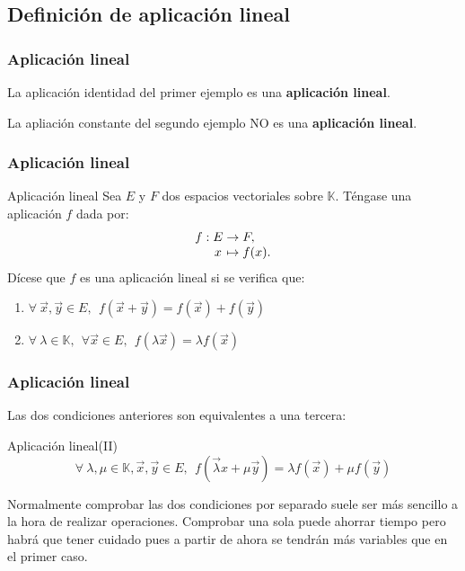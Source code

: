 \documentclass{beamer}
\begin{document}
\subsection{Definici\'on de aplicaci\'on lineal}


\begin{frame}
  \frametitle{Aplicaci\'on lineal}
La aplicaci\'on identidad del primer ejemplo es una \textbf{aplicaci\'on lineal}.

La apliaci\'on constante del segundo ejemplo NO es una \textbf{aplicaci\'on lineal}.
\end{frame}



\begin{frame}
  \frametitle{Aplicaci\'on lineal}
 \begin{block}{Aplicaci\'on  lineal}
Sea $E$ y $F$ dos espacios vectoriales sobre $\mathbb K$. T\'engase una aplicaci\'on $f$ dada por:
  \[
  \begin{array}{@{}r@{\;}c@{\;}c@{\;}l@{}}
    f: & E & \rightarrow & F,   \\
       & x & \mapsto     & f(x).
  \end{array}
\]
D\'icese que $f$ es una aplicaci\'on lineal si se verifica que:
\begin{enumerate}
\item $\forall\ \vec x,\vec y \in E, \ \ f(\vec x + \vec y) = f(\vec x) + f(\vec y)$
\item $\forall\ \lambda\in\mathbb K,\ \ \forall \vec x \in E, \ \ f(\lambda \vec x) = \lambda f(\vec x)$
\end{enumerate}
\end{block}
\end{frame}

\begin{frame}
  \frametitle{Aplicaci\'on lineal}
Las dos condiciones anteriores son equivalentes a una tercera:
 \begin{block}{Aplicaci\'on  lineal(II)} 
\[\forall\ \lambda,\mu \in\mathbb K, \vec x,\vec y \in E, \ \ f(\vec \lambda x + \mu \vec y) = \lambda f(\vec x) + \mu f(\vec y)\]
\end{block}

Normalmente comprobar las dos condiciones por separado suele ser m\'as sencillo a la hora de realizar operaciones. Comprobar una sola puede ahorrar tiempo pero habr\'a que tener cuidado pues a partir de ahora se tendr\'an m\'as variables que en el primer caso.
\end{frame}
\end{document}
